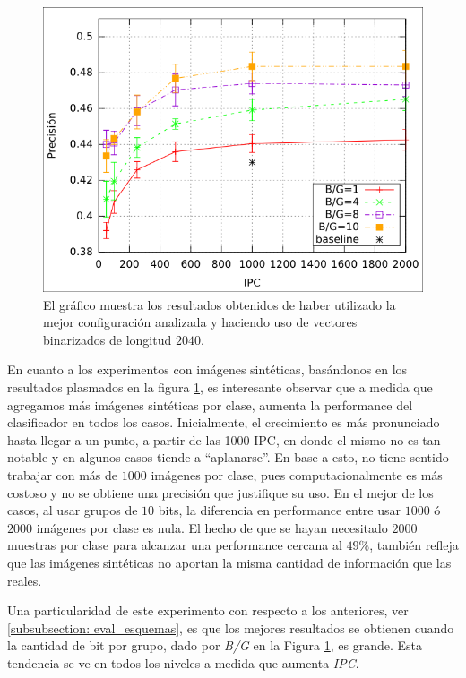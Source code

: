 			\begin{figure}[htbp]
				\centering
				\centerline{
					\includegraphics[scale=0.5]{img/resultados/sinteticas/mean_2040.png}
				}
				\caption[Sintéticas media 2040]{El gráfico muestra los resultados obtenidos de haber utilizado la mejor configuración analizada y haciendo uso de vectores binarizados de longitud $2040$.}
				\label{fig: Sinteticas-media-2040}
			\end{figure}

	En cuanto a los experimentos con imágenes sintéticas, basándonos en los resultados plasmados en la figura \ref{fig: Sinteticas-media-2040}, es interesante observar que a medida que agregamos más imágenes sintéticas por clase, aumenta la performance del clasificador en todos los casos. Inicialmente, el crecimiento es más pronunciado hasta llegar a un punto, a partir de las 1000 IPC, en donde el mismo no es tan notable y en algunos casos tiende a ``aplanarse''. En base a esto, no tiene sentido trabajar con más de $1000$ imágenes por clase, pues computacionalmente es más costoso y no se obtiene una precisión que justifique su uso. En el mejor de los casos, al usar grupos de $10$ bits, la diferencia en performance entre usar $1000$ ó $2000$ imágenes por clase es nula. El hecho de que se hayan necesitado $2000$ muestras por clase para alcanzar una performance cercana al $49\%$, también refleja que las imágenes sintéticas no aportan la misma cantidad de información que las reales.
	
	Una particularidad de este experimento con respecto a los anteriores, ver \ref{subsubsection: eval_esquemas}, es que los mejores resultados se obtienen cuando la cantidad de bit por grupo, dado por \textit{B/G} en la Figura \ref{fig: Sinteticas-media-2040}, es grande. Esta tendencia se ve en todos los niveles a medida que aumenta \textit{IPC}.

